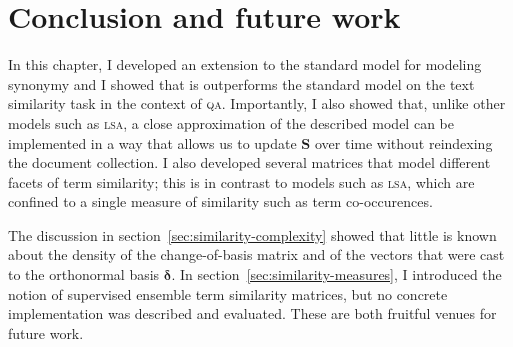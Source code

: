 \documentclass[
  digital, %
  notable, %
  lof,     %
  lot,     %
  nopalatino, color
]{fithesis3}
\def\abbr#1{\textsc{\MakeLowercase{#1}}}
\begin{document}
\section{Conclusion and future work}
\label{sec:similarity-conclusion}
In this chapter, I developed an extension to the standard model for modeling synonymy and I showed that is outperforms the standard
model on the text similarity task in the context of \abbr{QA}. Importantly, I
also showed that, unlike other models such as \index{LSA@\abbr{LSA}}\abbr{LSA}, a close
approximation of the described model can be implemented in a way that allows us
to update $\mathbf S$ over time without reindexing the
document collection. I also developed several matrices that model different
facets of term similarity; this is in contrast to models such as \abbr{LSA},
which are confined to a single measure of similarity such as term
co-occurences.

The discussion in section~\ref{sec:similarity-complexity} showed that little is
known about the density of the change-of-basis matrix 
and of the vectors that were cast to the orthonormal basis
$\bm\delta$. In section~\ref{sec:similarity-measures}, I
introduced the notion of supervised ensemble term similarity matrices, but no
concrete implementation was described and evaluated. These are both fruitful
venues for future work.

\FloatBarrier
\end{document}

